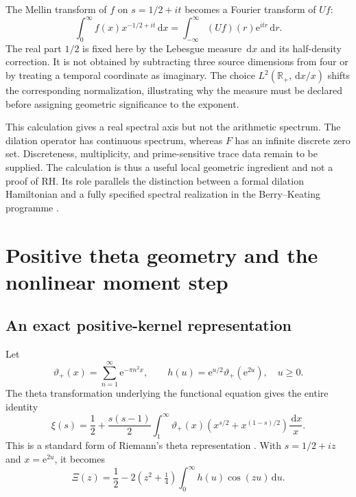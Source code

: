 \documentclass[11pt,letterpaper]{article}
\numberwithin{equation}{section}
\theoremstyle{definition}
\theoremstyle{remark}
\newcommand{\R}{\mathbb R}
\newcommand{\dd}{\,\mathrm d}
\newcommand{\e}{\mathrm e}
\begin{document}
The Mellin transform of $f$ on $s=1/2+it$ becomes a Fourier transform of $Uf$:
\begin{equation}
 \int_0^\infty f(x)x^{-1/2+it}\dd x
 =\int_{-\infty}^{\infty}(Uf)(r)\e^{itr}\dd r.
 \label{eq:mellinhalf}
\end{equation}
The real part $1/2$ is fixed here by the Lebesgue measure $\dd x$ and its half-density correction. It is not obtained by subtracting three source dimensions from four or by treating a temporal coordinate as imaginary. The choice $L^2(\R_+,\dd x/x)$ shifts the corresponding normalization, illustrating why the measure must be declared before assigning geometric significance to the exponent.

This calculation gives a real spectral axis but not the arithmetic spectrum. The dilation operator has continuous spectrum, whereas $F$ has an infinite discrete zero set. Discreteness, multiplicity, and prime-sensitive trace data remain to be supplied. The calculation is thus a useful local geometric ingredient and not a proof of RH. Its role parallels the distinction between a formal dilation Hamiltonian and a fully specified spectral realization in the Berry--Keating programme \cite{berrykeating}.

\section{Positive theta geometry and the nonlinear moment step}
\label{sec:theta}
\subsection{An exact positive-kernel representation}
Let
\begin{equation}
 \vartheta_+(x)=\sum_{n=1}^{\infty}\e^{-\pi n^2x},\qquad
 h(u)=\e^{u/2}\vartheta_+(\e^{2u}),\quad u\geq0.
\end{equation}
The theta transformation underlying the functional equation gives the entire identity
\begin{equation}
 \xi(s)=\frac12+\frac{s(s-1)}2
 \int_1^\infty\vartheta_+(x)
 \left(x^{s/2}+x^{(1-s)/2}\right)\frac{\dd x}{x}.
 \label{eq:thetaxi}
\end{equation}
This is a standard form of Riemann's theta representation \cite{riemann,titchmarsh,dlmf}. With $s=1/2+iz$ and $x=\e^{2u}$, it becomes
\begin{equation}
 \Xi(z)=\frac12-2(z^2+\tfrac14)
                    \int_0^\infty h(u)\cos(zu)\dd u.
 \label{eq:thetaint}
\end{equation}
\end{document}
